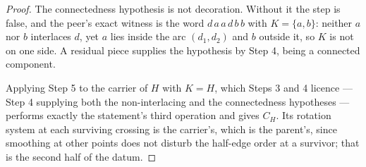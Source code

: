 \begin{proof}
The connectedness hypothesis is not decoration. Without it the step is false,
and the peer's exact witness is the word $d\,a\,a\,d\,b\,b$ with
$K=\{a,b\}$: neither $a$ nor $b$ interlaces $d$, yet $a$ lies inside the arc
$(d_1,d_2)$ and $b$ outside it, so $K$ is not on one side. A residual piece
supplies the hypothesis by Step 4, being a connected component.

Applying Step 5 to the carrier of $H$ with $K=H$, which Steps 3 and 4
licence --- Step 4 supplying both the non-interlacing and the connectedness
hypotheses --- performs exactly the statement's third operation and gives
$C_H$. Its rotation system at each surviving crossing is the carrier's,
which is the parent's, since smoothing at other points does not disturb the
half-edge order at a survivor; that is the second half of the datum.
\end{proof}

